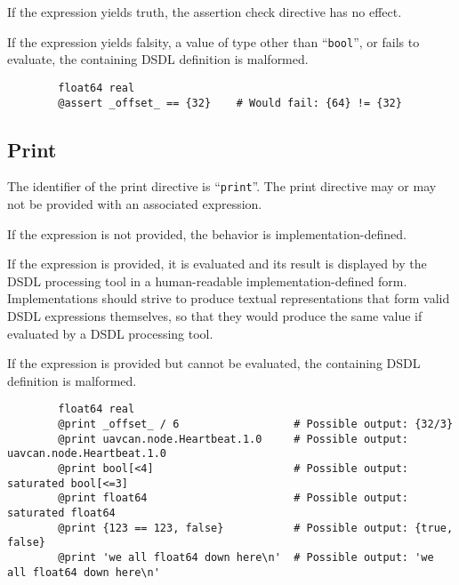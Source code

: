 If the expression yields truth, the assertion check directive has no effect.

If the expression yields falsity, a value of type other than ``\verb|bool|'', or fails to evaluate,
the containing DSDL definition is malformed.

\begin{remark}
    \begin{verbatim}
        float64 real
        @assert _offset_ == {32}    # Would fail: {64} != {32}
    \end{verbatim}
\end{remark}

\subsection{Print}

The identifier of the print directive is ``\verb|print|''.
The print directive may or may not be provided with an associated expression.

If the expression is not provided, the behavior is implementation-defined.

If the expression is provided, it is evaluated and its result is displayed by the DSDL processing tool in
a human-readable implementation-defined form.
Implementations should strive to produce textual representations that form valid DSDL expressions themselves,
so that they would produce the same value if evaluated by a DSDL processing tool.

If the expression is provided but cannot be evaluated, the containing DSDL definition is malformed.

\begin{remark}
    \begin{verbatim}
        float64 real
        @print _offset_ / 6                  # Possible output: {32/3}
        @print uavcan.node.Heartbeat.1.0     # Possible output: uavcan.node.Heartbeat.1.0
        @print bool[<4]                      # Possible output: saturated bool[<=3]
        @print float64                       # Possible output: saturated float64
        @print {123 == 123, false}           # Possible output: {true, false}
        @print 'we all float64 down here\n'  # Possible output: 'we all float64 down here\n'
    \end{verbatim}
\end{remark}

